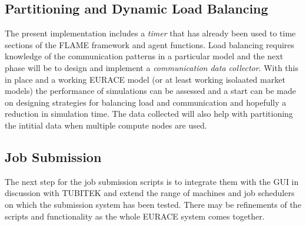 
\subsection{Partitioning and Dynamic Load Balancing}

The present implementation includes a \textit{timer} that has already been used to time sections of the FLAME framework and agent functions. Load balancing requires knowledge of the communication patterns in a particular model and the next phase will be to design and implement a \textit{communication data collector}. With this in place and a working EURACE model (or at least working isolaated market models) the performance of simulations can be assessed and a start can be made on designing strategies for balancing load and communication and hopefully a reduction in simulation time. The data collected will also help with partitioning the intitial data when multiple compute nodes are used.

\subsection{Job Submission}

The next step for the job submission scripts is to integrate them with the GUI in discussion with TUBITEK and extend the range of machines and job schedulers on which the submission system has been tested. There may be refinements of the scripts and functionality as the whole EURACE system comes together. 

